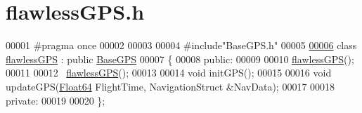 \hypertarget{flawless_g_p_s_8h_source}{}\section{flawless\+G\+P\+S.\+h}
\label{flawless_g_p_s_8h_source}

\begin{DoxyCode}
00001 \textcolor{preprocessor}{#pragma once}
00002 
00003 
00004 \textcolor{preprocessor}{#include"BaseGPS.h"}
00005 
\hyperlink{classflawless_g_p_s}{00006} \textcolor{keyword}{class }\hyperlink{classflawless_g_p_s}{flawlessGPS} : \textcolor{keyword}{public} \hyperlink{class_base_g_p_s}{BaseGPS}
00007 \{
00008 \textcolor{keyword}{public}:
00009 
00010     \hyperlink{classflawless_g_p_s}{flawlessGPS}();
00011 
00012     ~\hyperlink{classflawless_g_p_s}{flawlessGPS}();
00013 
00014     \textcolor{keywordtype}{void} initGPS();
00015 
00016     \textcolor{keywordtype}{void} updateGPS(\hyperlink{group___tools_ga3f1431cb9f76da10f59246d1d743dc2c}{Float64} FlightTime, NavigationStruct &NavData);
00017 
00018 \textcolor{keyword}{private}:
00019 
00020 \};
\end{DoxyCode}
